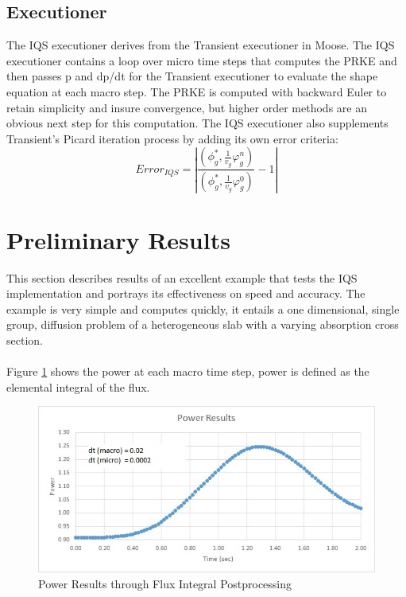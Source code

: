 \documentclass[11pt]{scrartcl}
\newcommand{\be}{\begin{equation}}
\newcommand{\ee}{\end{equation}}
\begin{document}
\subsection{Executioner}
The IQS executioner derives from the Transient executioner in Moose.  The IQS executioner contains a loop over micro time steps that computes the PRKE and then passes p and dp/dt for the Transient executioner to evaluate the shape equation at each macro step.  The PRKE is computed with backward Euler to retain simplicity and insure convergence, but higher order methods are an obvious next step for this computation.   The IQS executioner also supplements Transient’s Picard iteration process by adding its own error criteria: 
\be
Error_{IQS}=\left|\frac{\left(\phi^*_g,\frac{1}{v_g}\varphi_g^n\right)}{\left(\phi_g^*,\frac{1}{v_g}\varphi_g^0\right)}-1\right|
\ee

\section{Preliminary Results}
This section describes results of an excellent example that tests the IQS implementation and portrays its effectiveness on speed and accuracy.  The example is very simple and computes quickly, it entails a one dimensional, single group, diffusion problem of a heterogeneous slab with a varying absorption cross section.
\\ \\
Figure \ref{fig:power} shows the power at each macro time step, power is defined as the elemental integral of the flux.
\begin{figure}[h]
\includegraphics[width=\linewidth]{power_results.jpg}
\caption{Power Results through Flux Integral Postprocessing}
\label{fig:power}
\end{figure}
\end{document}
